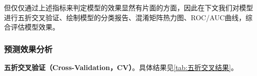 \documentclass{MathorCupModeling}
\begin{document}
\begin{table}[H]
	\centering
	\caption{XGBoost模型最终效果}
	\label{tab:XGBoostResult}
\end{table}

但仅仅通过上述指标来判定模型的效果显然有片面的方面，因此在下文我们对模型进行五折交叉验证、绘制模型的分类报告、混淆矩阵热力图、ROC/AUC曲线，综合评估模型效果。
	\subsubsection{预测效果分析}
	\textbf{五折交叉验证（Cross-Validation，CV）}。具体结果见\textcolor{blue}{\cref{tab:五折交叉结果}}。
\begin{table}[H]
	\centering
	\caption{XGboost模型五折交叉验证结果}
	\label{tab:五折交叉结果}
\end{table}
\end{document}
